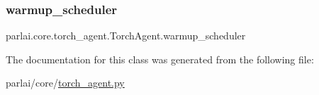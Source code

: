 \subsubsection{\texorpdfstring{warmup\+\_\+scheduler}{warmup\_scheduler}}
{\footnotesize\ttfamily parlai.\+core.\+torch\+\_\+agent.\+Torch\+Agent.\+warmup\+\_\+scheduler}



The documentation for this class was generated from the following file\+:\begin{DoxyCompactItemize}
\item 
parlai/core/\hyperlink{torch__agent_8py}{torch\+\_\+agent.\+py}\end{DoxyCompactItemize}
